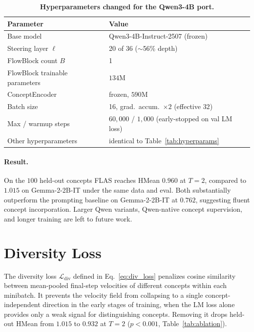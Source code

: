 \documentclass{article}
\newcommand{\cL}{\mathcal{L}}
\begin{document}
\begin{table}[htbp]
\centering
\small
\begin{tabular}{ll}
\toprule
\textbf{Parameter} & \textbf{Value} \\
\midrule
Base model & Qwen3-4B-Instruct-2507 (frozen) \\
Steering layer $\ell$ & 20 of 36 ($\sim$56\% depth) \\
FlowBlock count $B$ & 1 \\
FlowBlock trainable parameters & $134$M \\
ConceptEncoder & frozen, $590$M \\
Batch size & 16, grad.\ accum.\ $\times 2$ (effective $32$) \\
Max / warmup steps & $60{,}000$ / $1{,}000$ (early-stopped on val LM loss) \\
Other hyperparameters & identical to Table~\ref{tab:hyperparams} \\
\bottomrule
\end{tabular}
\caption{\textbf{Hyperparameters changed for the Qwen3-4B port.}}
\label{tab:qwen-hyperparams}
\end{table}

\paragraph{Result.}
On the $100$ held-out concepts FLAS reaches HMean $0.960$ at $T\!=\!2$, compared to $1.015$ on Gemma-2-2B-IT under the same data and eval. Both substantially outperform the prompting baseline on Gemma-2-2B-IT at $0.762$, suggesting fluent concept incorporation. Larger Qwen variants, Qwen-native concept supervision, and longer training are left to future work.

\section{Diversity Loss}
\label{app:div}

The diversity loss $\cL_\text{div}$ defined in Eq.~\ref{eq:div_loss} penalizes cosine similarity between mean-pooled final-step velocities of different concepts within each minibatch. It prevents the velocity field from collapsing to a single concept-independent direction in the early stages of training, when the LM loss alone provides only a weak signal for distinguishing concepts. Removing it drops held-out HMean from $1.015$ to $0.932$ at $T\!=\!2$ ($p < 0.001$, Table~\ref{tab:ablation}).
\end{document}
